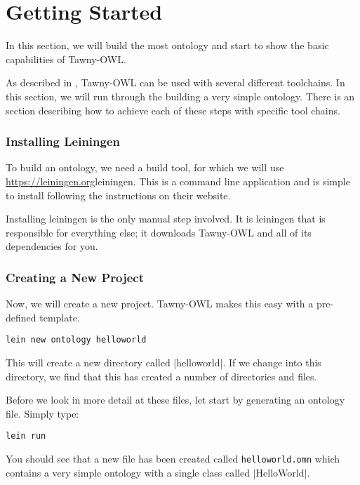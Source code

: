 \chapter{Getting Started}

In this section, we will build the most ontology and start to show the
basic capabilities of Tawny-OWL.

As described in \label{/the/environment-the-environment}, Tawny-OWL can be
used with several different toolchains. In this section, we will run
through the building a very simple ontology. There is an section describing
how to achieve each of these steps with specific tool chains.

\subsection{Installing Leiningen}

To build an ontology, we need a build tool, for which we will use
\url{https://leiningen.org}{leiningen}. This is a command line
application and is simple to install following the instructions on
their website.

Installing leiningen is the only manual step involved. It is leiningen
that is responsible for everything else; it downloads Tawny-OWL and
all of its dependencies for you.

\subsection{Creating a New Project}

Now, we will create a new project. Tawny-OWL makes this easy with a
pre-defined template.

\begin{verbatim}
lein new ontology helloworld
\end{verbatim}

This will create a new directory called |helloworld|. If we change
into this directory, we find that this has created a number of
directories and files.

Before we look in more detail at these files, let start by generating
an ontology file. Simply type:

\begin{verbatim}
lein run
\end{verbatim}

You should see that a new file has been created called
\verb|helloworld.omn| which contains a very simple ontology with a
single class called |HelloWorld|.

